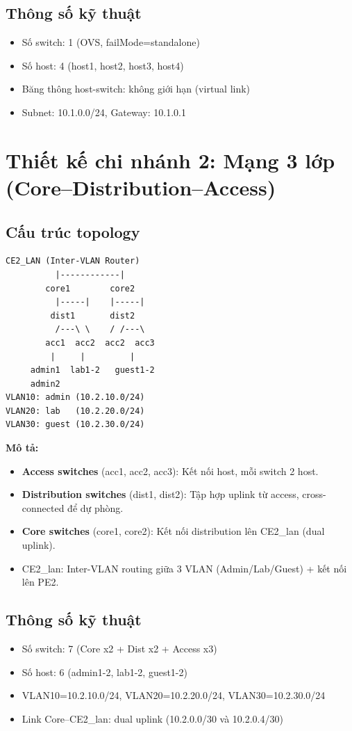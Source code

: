 \subsection{Thông số kỹ thuật}
\begin{itemize}
    \item Số switch: 1 (OVS, failMode=standalone)
    \item Số host: 4 (host1, host2, host3, host4)
    \item Băng thông host-switch: không giới hạn (virtual link)
    \item Subnet: 10.1.0.0/24, Gateway: 10.1.0.1
\end{itemize}

\section{Thiết kế chi nhánh 2: Mạng 3 lớp (Core--Distribution--Access)}

\subsection{Cấu trúc topology}

\begin{Verbatim}[fontsize=\small, frame=single]
         CE2_LAN (Inter-VLAN Router)
          |------------|
        core1        core2
          |-----|    |-----|
         dist1       dist2
          /---\ \    / /---\
        acc1  acc2  acc2  acc3
         |     |         |
     admin1  lab1-2   guest1-2
     admin2
VLAN10: admin (10.2.10.0/24)
VLAN20: lab   (10.2.20.0/24)
VLAN30: guest (10.2.30.0/24)
\end{Verbatim}

\textbf{Mô tả:}
\begin{itemize}
    \item \textbf{Access switches} (acc1, acc2, acc3): Kết nối host, mỗi switch 2 host.
    \item \textbf{Distribution switches} (dist1, dist2): Tập hợp uplink từ access, cross-connected để dự phòng.
    \item \textbf{Core switches} (core1, core2): Kết nối distribution lên CE2\_lan (dual uplink).
    \item CE2\_lan: Inter-VLAN routing giữa 3 VLAN (Admin/Lab/Guest) + kết nối lên PE2.
\end{itemize}

\subsection{Thông số kỹ thuật}
\begin{itemize}
    \item Số switch: 7 (Core x2 + Dist x2 + Access x3)
    \item Số host: 6 (admin1-2, lab1-2, guest1-2)
    \item VLAN10=10.2.10.0/24, VLAN20=10.2.20.0/24, VLAN30=10.2.30.0/24
    \item Link Core--CE2\_lan: dual uplink (10.2.0.0/30 và 10.2.0.4/30)
\end{itemize}

